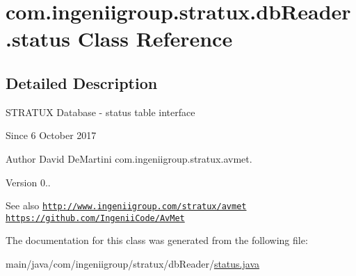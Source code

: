 \hypertarget{classcom_1_1ingeniigroup_1_1stratux_1_1db_reader_1_1status}{}\section{com.\+ingeniigroup.\+stratux.\+db\+Reader.\+status Class Reference}
\label{classcom_1_1ingeniigroup_1_1stratux_1_1db_reader_1_1status}


\subsection{Detailed Description}
S\+T\+R\+A\+T\+UX Database -\/ status table interface

\begin{DoxySince}{Since}
6 October 2017 
\end{DoxySince}
\begin{DoxyAuthor}{Author}
David De\+Martini  com.\+ingeniigroup.\+stratux.\+avmet. 
\end{DoxyAuthor}
\begin{DoxyVersion}{Version}
0.. 
\end{DoxyVersion}
\begin{DoxySeeAlso}{See also}
\href{http://www.ingeniigroup.com/stratux/avmet}{\tt http\+://www.\+ingeniigroup.\+com/stratux/avmet}  \href{https://github.com/IngeniiCode/AvMet}{\tt https\+://github.\+com/\+Ingenii\+Code/\+Av\+Met} 
\end{DoxySeeAlso}


The documentation for this class was generated from the following file\+:\begin{DoxyCompactItemize}
\item 
main/java/com/ingeniigroup/stratux/db\+Reader/\hyperlink{status_8java}{status.\+java}\end{DoxyCompactItemize}
